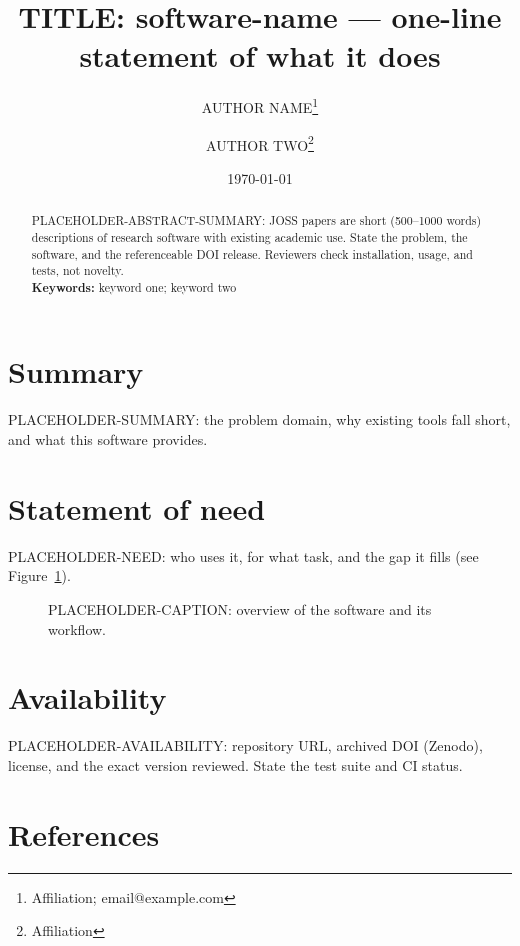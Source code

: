 \documentclass[11pt]{article}
\title{TITLE: software-name — one-line statement of what it does}
\author{AUTHOR NAME\thanks{Affiliation; email@example.com} \and AUTHOR TWO\thanks{Affiliation}}
\date{\today}
\begin{document}
\maketitle

\begin{abstract}
\noindent PLACEHOLDER-ABSTRACT-SUMMARY: JOSS papers are short (500--1000 words) descriptions of
research software with existing academic use. State the problem, the software,
and the referenceable DOI release. Reviewers check installation, usage, and tests,
not novelty.
\\[2mm]
\textbf{Keywords:} keyword one; keyword two
\end{abstract}

\section{Summary}
PLACEHOLDER-SUMMARY: the problem domain, why existing tools fall short, and what
this software provides.

\section{Statement of need}
PLACEHOLDER-NEED: who uses it, for what task, and the gap it fills
(see Figure~\ref{fig:placeholder}).

\begin{figure}[t]
\centering
\caption{PLACEHOLDER-CAPTION: overview of the software and its workflow.}
\label{fig:placeholder}
\end{figure}

\section{Availability}
PLACEHOLDER-AVAILABILITY: repository URL, archived DOI (Zenodo), license,
and the exact version reviewed. State the test suite and CI status.

\section{References}


\end{document}
